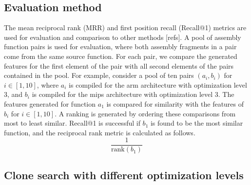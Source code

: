 \documentclass[conference,compsoc]{IEEEtran}
\begin{document}
\subsection{Evaluation method}

The mean reciprocal rank (MRR) and first position recall (Recall@1) metrics are used for evaluation and comparison to other methods
[refs].
A pool of assembly function pairs is used for evaluation, where both assembly fragments in a pair come from the same source function.
For each pair, we compare the generated features for the first element of the pair with all second elements of the pairs contained
in the pool.  For example, consider a pool of ten pairs \((a_i, b_i)\) for \(i \in [1, 10]\), where \(a_i\) is compiled for the arm
architecture with optimization level 3, and \(b_i\) is compiled for the mips architecture with optimization
level 3. The features generated for function \(a_1\) is compared for similarity with the features of \(b_i\) for \(i \in [1, 10]\).
A ranking is generated by ordering these comparisons from most to least similar. Recall@1 is successful
if \(b_1\) is found to be the most similar function, and the reciprocal rank metric is calculated as follows.
\[\frac{1}{\text{rank}(b_1)}\]

\subsection{Clone search with different optimization levels}
\end{document}
